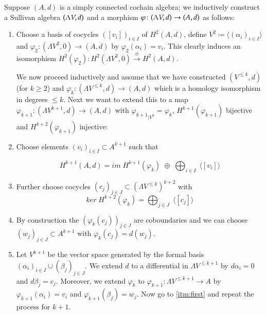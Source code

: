 \begin{Algorithm}
\label{alg:ConstructionOfMinimalSullivanAlgebra}
 Suppose $(A,d)$ is a simply connected cochain algebra; we inductively construct a Sullivan algebra $(\Lambda V,d)$ and a morphism
 $\varphi \colon (\Lambda V,d) \to (A,d)$ as follows:
 
 \begin{enumerate}
  \item \label{itm:FirstAlgorithmStep} Choose a basis of cocycles $([v_i])_{i \in I}$ of $H^2(A,d)$, 
  define $V^2 \coloneqq \langle (\alpha_i)_{i \in I} \rangle$ and
  $\varphi_2 \colon (\Lambda V^2,0) \to (A,d)$ by $\varphi_2(\alpha_i) = v_i$. This clearly induces an isomorphism 
  $H^2(\varphi_2) \colon H^2(\Lambda V^2, 0) \overset{\cong}{\to} H^2(A,d)$.
   
   We now proceed inductively and assume that we have constructed $(V^{\leq k}, d)$ (for $k \geq 2$) and
   ${\varphi_k \colon (\Lambda V^{\leq k}, d) \to (A,d)}$ which is a homology isomorphism in degrees $\leq k$.
   Next we want to extend this to a map $\varphi_{k+1} \colon (\Lambda V^{k+1}, d) \to (A,d)$ with 
   ${\varphi_{k+1}}_{|V^k} = \varphi_k$, $H^{k+1}(\varphi_{k+1})$ bijective and $H^{k + 2}(\varphi_{k+1})$ injective:
   
   \item \label{itm:first} Choose elements $(v_i)_{i \in I} \subset A^{k+1}$ such that
   
   $$H^{k+1}(A,d) = im \; H^{k+1}(\varphi_k) \; \oplus \; \bigoplus_{i \in I} \; \langle [v_i] \rangle $$
   
   \item \label{itm:third} Further choose cocycles $(c_j)_{j \in J} \subset (\Lambda V^{\leq k})^{k+2}$ with
   $$ ker \; H^{k+2}(\varphi_k) = \bigoplus_{j \in J} \; \langle [c_j] \rangle$$
   
   \item By construction the $(\varphi_k(c_j))_{j \in J}$ are coboundaries and we can choose 
   $(w_j)_{j \in J} \subset A^{k+1}$ with $\varphi_k (c_j) = d(w_j)$.
   \item \label{itm:second} Let 
   $V^{k+1}$ be the vector space generated by the formal basis $(\alpha_i)_{i \in I} \cup (\beta_j)_{j \in J}$. We extend $d$
   to a differential in $\Lambda V^{\leq k+1}$ by $d \alpha_i = 0$ and $d \beta_j = c_j$. Moreover, we extend $\varphi_k$
   to $\varphi_{k+1} \colon \Lambda V^{ \leq k+1} \to A$ by $\varphi_{k+1} (\alpha_i) = v_i$ and 
   $\varphi_{k+1} (\beta_j) = w_j$. Now go to \ref{itm:first} and repeat the process for $k+1$.
 \end{enumerate}

\end{Algorithm}
